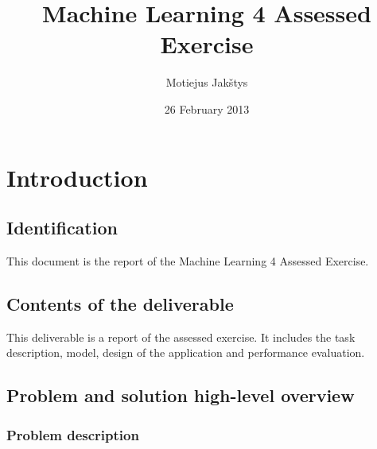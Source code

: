 \documentclass[english,11pt]{article}
\numberwithin{equation}{section}
\begin{document}
\title{Machine Learning 4 Assessed Exercise}
\author{Motiejus Jakštys}
\date{26 February 2013}

\maketitle
\pagebreak
\tableofcontents
\pagebreak

\section{Introduction}
\subsection{Identification}
This document is the report of the Machine Learning 4 Assessed Exercise.

\subsection{Contents of the deliverable}

This deliverable is a report of the assessed exercise. It includes the task
description, model, design of the application and performance evaluation.

\subsection{Problem and solution high-level overview}

\subsubsection{Problem description}
\end{document}
